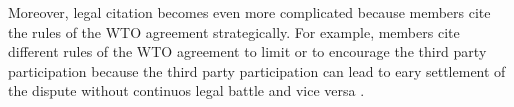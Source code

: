 Moreover, legal citation becomes even more complicated because members cite the 
rules of the WTO agreement strategically. For example,
members cite different rules of the WTO agreement to limit or to encourage 
the third party participation because the third party 
participation can lead to eary settlement of the dispute without continuos 
legal battle and vice versa  \cite{who_gets}.